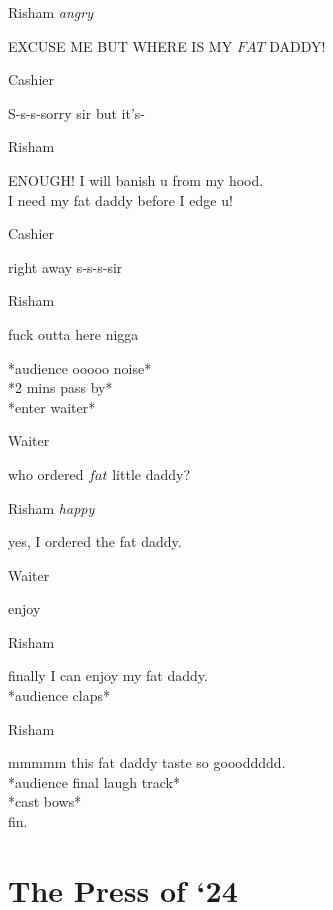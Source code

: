\documentclass[12pt]{article}
\begin{document}
Risham
\textit{ angry}
\begin{center}
    EXCUSE ME BUT WHERE IS MY $FAT$ DADDY!
\end{center}

Cashier
\begin{center}
    S-s-s-sorry sir but it’s-
\end{center}

Risham
\begin{center}
    ENOUGH! I will banish u from my hood.\\I need my fat daddy before I edge u! 
\end{center}

Cashier
\begin{center}
    right away s-s-s-sir 
\end{center}

Risham
\begin{center}
    fuck outta here nigga
\end{center}

\begin{center}
    *audience ooooo noise*\\*2 mins pass by*\\*enter waiter*
\end{center}

Waiter
\begin{center}
    who ordered $fat$ little daddy?
\end{center}

Risham
\textit{ happy}
\begin{center}
    yes, I ordered the fat daddy.
\end{center}

Waiter
\begin{center}
    enjoy
\end{center}

Risham
\begin{center}
    finally I can enjoy my fat daddy.\\
    *audience claps*
\end{center}

Risham
\begin{center}
    mmmmm this fat daddy taste so goooddddd.\\
    *audience final laugh track*\\*cast bows*\\
    fin.
\end{center}

\newpage
\section*{The Press of ‘24}
\end{document}
